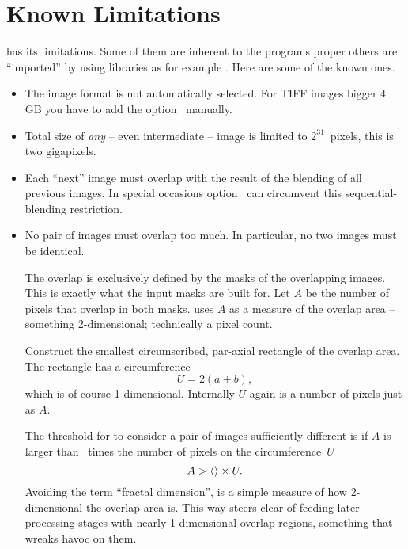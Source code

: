 

\chapter[Known Limitations]{\label{sec:known-limitations}%
  Known Limitations}

\App{} has its limitations.  Some of them are inherent to the programs proper others are
``imported'' by using libraries as for example .  Here are
some of the known ones.

\begin{itemize}
\item
  The  image format is not automatically
  selected. For TIFF images bigger 4 GB you have to add the 
  option~ manually.

\item
  Total size of \emph{any} -- even intermediate -- image is limited to $2^{31}$~pixels, this is
  two gigapixels.

\ifenblend
\item
  Each ``next'' image must overlap with the result of the blending of all previous images.  In
  special occasions option~ can circumvent this sequential-blending
  restriction.

\item
  No pair of images must overlap too much.  In particular, no two images must be identical.

  \begin{geeknote}
    The overlap is exclusively defined by the masks of the overlapping images.  This is exactly
    what the input masks are built for.  Let $A$ be the number of pixels that overlap in both
    masks.  \App{} uses $A$ as a measure of the overlap area -- something 2\hyp dimensional;
    technically a pixel count.

    Construct the smallest circumscribed, par-axial rectangle of the overlap area.  The
    rectangle has a circumference
    \[
    U = 2 (a + b),
    \]
    which is of course 1-dimensional.  Internally $U$ again is a number of pixels just as $A$.

    The threshold for \App{} to consider a pair of images sufficiently different is if $A$ is
    larger than ~times the number of pixels on the
    circumference~$U$
    \begin{equation}\label{equ:overlap-threshold}
    A > \val{val:overlap-check-threshold} \times U.
    \end{equation}
    Avoiding the term ``fractal dimension'',  is a simple measure
    of how 2\hyp dimensional the overlap area is.  This way \App{} steers clear of feeding later
    processing stages with nearly 1\hyp dimensional overlap regions, something that wreaks havoc
    on them.
  \end{geeknote}


\end{itemize}
